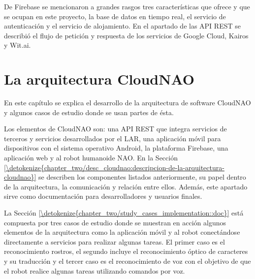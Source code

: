 \documentclass[letterpaper,12pt,spanish]{report}
\begin{document}
De Firebase se mencionaron a grandes rasgos 
tres características que ofrece y que se ocupan
en este proyecto, la base de datos en tiempo real,
el servicio de autenticación y el servicio de alojamiento.
En el apartado de las API REST se describió 
el flujo de petición y respuesta
de los servicios de Google Cloud, Kairos y Wit.ai.

\chapter{La arquitectura CloudNAO}
\label{\detokenize{chapter_two:la-arquitectura-cloudnao}}\label{\detokenize{chapter_two::doc}}

En este capítulo se explica el desarrollo de la 
arquitectura de software CloudNAO y algunos casos de 
estudio donde se usan partes de ésta.

Los elementos de CloudNAO son: una API REST que integra servicios de terceros y servicios desarrollados por el LAR, una aplicación móvil para 
dispositivos con el sistema operativo Android, la
plataforma Firebase, una aplicación web y 
al robot humanoide NAO.  En la Sección 
\ref{\detokenize{chapter_two/desc_cloudnao:descripcion-de-la-arquitectura-cloudnao}} se describen los componentes 
listados anteriormente, su papel dentro de la arquitectura, la comunicación y relación entre ellos. 
Además, este apartado sirve como documentación para
desarrolladores y usuarios finales.

La Sección \ref{\detokenize{chapter_two/study_cases_implementation::doc}} está compuesta por tres casos de estudio
donde se muestran en acción algunos elementos de la arquitectura como la aplicación móvil y al robot conectándose directamente a servicios para realizar algunas tareas. El primer caso es el 
reconocimiento rostros, el segundo incluye el reconocimiento
óptico de caracteres y su traducción y el tercer caso es
el reconocimiento de voz con el objetivo de que
el robot realice algunas tareas utilizando comandos por voz.









\end{document}
